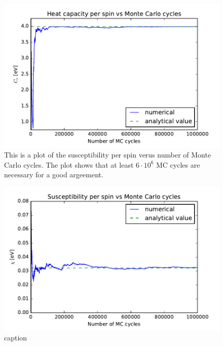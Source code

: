 \begin{figure}[H]
\includegraphics[width=\linewidth]{../results/4b/N_2_heat_capasity}\caption{This is a plot of the susceptibility per spin verus number of Monte Carlo cycles. The plot shows that at least $ 6 \cdot 10^{6} $ MC cycles are necessary for a good argeement.}\label{fig:L_2_heat_capacity}
\end{figure}

\begin{figure}[H]
\includegraphics[width=\linewidth]{../results/4b/N_2_susceptibility}\caption{caption}\label{fig:L_2_susceptibility}
\end{figure}